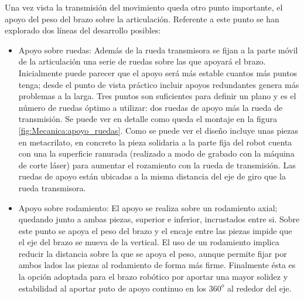 	Una vez vista la transmisión del movimiento queda otro punto importante, el apoyo del peso del brazo sobre la articulación. Referente a este punto se han explorado dos líneas del desarrollo posibles:
    \begin{itemize}
        \item Apoyo sobre ruedas: Además de la rueda transmisora se fijan a la parte móvil de la articulación una serie de ruedas sobre las que apoyará el brazo. Inicialmente puede parecer que el apoyo será más estable cuantos más puntos tenga; desde el punto de vista práctico incluir apoyos redundantes genera más problemas a la larga. Tres puntos son suficientes para definir un plano y es el número de ruedas óptimo a utilizar: dos ruedas de apoyo más la rueda de transmisión. Se puede ver en detalle como queda el montaje en la figura \ref{fig:Mecanica:apoyo_ruedas}. Como se puede ver el diseño incluye unas piezas en metacrilato, en concreto la pieza solidaria a la parte fija del robot cuenta con una la superficie ranurada (realizado a modo de grabado con la máquina de corte láser) para aumentar el rozamiento con la rueda de transmisión. Las ruedas de apoyo están ubicadas a la misma distancia del eje de giro que la rueda transmisora.
        \item Apoyo sobre rodamiento: El apoyo se realiza sobre un rodamiento axial; quedando junto a ambas piezas, superior e inferior, incrustados entre si. Sobre este punto se apoya el peso del brazo y el encaje entre las piezas impide que el eje del brazo se mueva de la vertical. El uso de un rodamiento implica reducir la distancia sobre la que se apoya el peso, aunque permite fijar por ambos lados las piezas al rodamiento de forma más firme. Finalmente ésta es la opción adoptada para el brazo robótico por aportar una mayor solidez y estabilidad al aportar puto de apoyo continuo en los $360^o$ al rededor del eje.
    \end{itemize}

